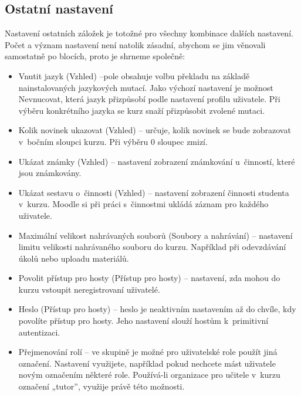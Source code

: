 \documentclass[
print,
  11pt,
  table,   
  nolof,    
  nolot,
  oneside,
  draft
]{fithesis3}
\begin{document}
\subsection*{Ostatní nastavení}
Nastavení ostatních záložek je totožné pro všechny kombinace dalších nastavení. Počet a význam nastavení není natolik zásadní, abychom se jim věnovali samostatně po blocích, proto je shrneme společně:
\begin{itemize}
	\item Vnutit jazyk (Vzhled) --pole obsahuje volbu překladu na základě nainstalovaných jazykových mutací. Jako výchozí nastavení je možnost Nevnucovat, která jazyk přizpůsobí podle nastavení profilu uživatele. Při výběru konkrétního jazyka se kurz snaží přizpůsobit zvolené mutaci.
	\item Kolik novinek ukazovat (Vzhled) -- určuje, kolik novinek se bude zobrazovat v~bočním sloupci kurzu. Při výběru 0 sloupec zmizí.
	\item Ukázat známky (Vzhled) -- nastavení zobrazení známkování u~činností, které jsou známkovány.
	\item Ukázat sestavu o~činnosti (Vzhled) -- nastavení zobrazení činnosti studenta v~kurzu. Moodle si při práci s~činnostmi ukládá záznam pro každého uživatele.
	\item Maximální velikost nahrávaných souborů (Soubory a nahrávání) -- nastavení limitu velikosti nahrávaného souboru do kurzu. Například při odevzdávání úkolů nebo uploadu materiálů.
	\item Povolit přístup pro hosty (Přístup pro hosty) -- nastavení, zda mohou do kurzu vstoupit neregistrovaní uživatelé. 
	\item Heslo (Přístup pro hosty) -- heslo je neaktivním nastavením až do chvíle, kdy povolíte přístup pro hosty. Jeho nastavení slouží hostům k~primitivní autentizaci.
	\item Přejmenování rolí -- ve skupině je možné pro uživatelské role použít jiná označení. Nastavení využijete, například pokud nechcete mást uživatele novým označením některé role. Používá-li organizace pro učitele v~kurzu označení „tutor”, využije právě této možnosti. 
\end{itemize}
\end{document}
